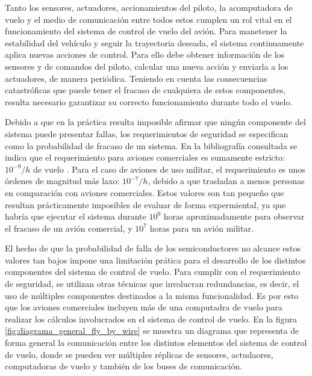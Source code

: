 Tanto los sensores, actuadores, accionamientos del piloto, la acomputadora de vuelo y el medio de comunicación entre todos estos cumplen un rol vital en el funcionamiento del sistema de control de vuelo del avión. Para manetener la estabilidad del vehículo y seguir la trayectoria deseada, el sistema continuamente aplica nuevas acciones de control. Para ello debe obtener información de los sensores y de comandos del piloto, calcular una nueva acción y enviarla a los actuadores, de manera periódica. Teniendo en cuenta las consecuencias catastróficas que puede tener el fracaso de cualquiera de estos componentes, resulta necesario garantizar su correcto funcionamiento durante todo el vuelo.

Debido a que en la práctica resulta imposible afirmar que ningún componente del sistema puede presentar fallas, los requerimientos de seguridad se especifican como la probabilidad de fracaso de un sistema. En la bibliografía consultada se indica que el requerimiento para aviones comerciales es sumamente estricto: $10^{-9}/h$ de vuelo \cite[p.~217]{collinson2023introduction} \cite{yeh1996triple} \cite{lala1994architectural}. Para el caso de aviones de uso militar, el requerimiento es unos órdenes de magnitud más laxo: $10^{-7}/h$, debido a que trasladan a menos personas en comparación con aviones comerciales. Estos valores son tan pequeño que resultan prácticamente imposibles de evaluar de forma expermiental, ya que habría que ejecutar el sistema durante $10^9$ horas aproximadamente para observar el fracaso de un avión comercial, y $10^7$ horas para un avión militar.

El hecho de que la probabilidad de falla de los semiconductores no alcance estos valores tan bajos \cite[p.~4]{Fulton2014AirborneEH} impone una limitación prática para el desarrollo de los distintos componentes del sistema de control de vuelo. Para cumplir con el requerimiento de seguridad, se utilizan otras técnicas que involucran redundancias, es decir, el uso de múltiples componentes destinados a la misma funcionalidad. Es por esto que los aviones comerciales incluyen más de una computadra de vuelo para realizar los cálculos involucrados en el sistema de control de vuelo. En la figura \ref{fig:diagrama_general_fly_by_wire} se muestra un diagrama que representa de forma general la comunicación entre los distintos elementos del sistema de control de vuelo, donde se pueden ver múltiples réplicas de sensores, actudaores, computadoras de vuelo y también de los buses de comunicación.



